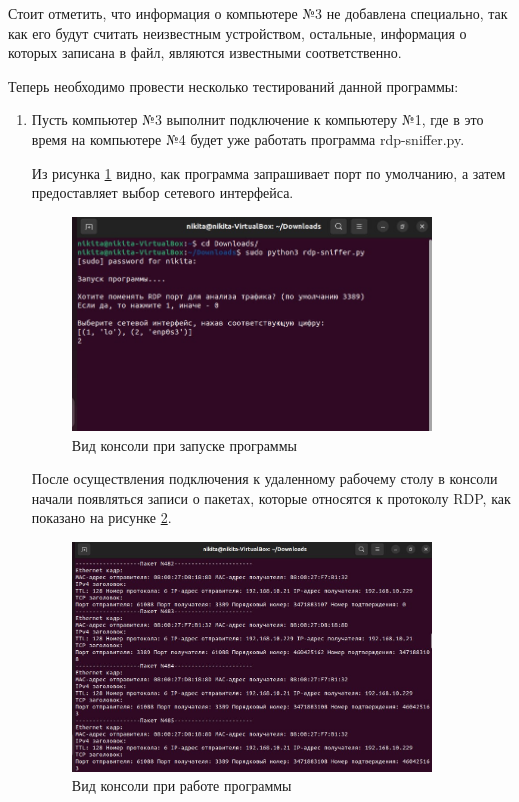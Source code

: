 \documentclass[bachelor, och, coursework]{SCWorks}
\begin{document}
  Стоит отметить, что информация о компьютере №3 не добавлена специально, так как его будут считать неизвестным устройством, остальные,
  информация о которых записана в файл, являются известными соответственно.
  
  Теперь необходимо провести несколько тестирований данной программы:

  \begin{enumerate}
    \item Пусть компьютер №3 выполнит подключение к компьютеру №1, где в это время на компьютере №4 будет уже работать программа rdp-sniffer.py.
    
    Из рисунка \ref{cmd-sniff1} видно, как программа запрашивает порт по умолчанию, а затем предоставляет выбор сетевого интерфейса. 

    \begin{figure}[H]
      \centering
      \includegraphics[width=0.9\textwidth]{photo/cmd-sniff1.png}
      \caption{Вид консоли при запуске программы}
      \label{cmd-sniff1}
    \end{figure}

    После осуществления подключения к удаленному рабочему столу в консоли начали появляться записи о пакетах, которые относятся к протоколу RDP, как показано на рисунке
    \ref{cmd-sniff2}.

    \begin{figure}[H]
      \centering
      \includegraphics[width=0.9\textwidth]{photo/cmd-sniff2.png}
      \caption{Вид консоли при работе программы}
      \label{cmd-sniff2}
    \end{figure}


\end{enumerate}
\end{document}
